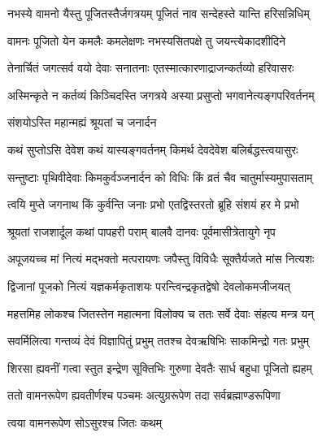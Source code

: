 \twolineshloka
{नभस्ये वामनो यैस्तु पूजितस्तैर्जगत्रयम्}
{पूजितं नाव सन्देहस्ते यान्ति हरिसन्निधिम्} %

\twolineshloka
{वामनः पूजितो येन कमलैः कमलेक्षणः}
{नभस्यसितपक्षे तु जयन्त्येकादशीदिने} %

\twolineshloka
{तेनार्चितं जगत्सर्व वयो देवाः सनातनाः}
{एतस्मात्कारणाद्राजन्कर्तव्यो हरिवासरः} %

\twolineshloka
{अस्मिन्कृते न कर्तव्यं किञ्चिदस्ति जगत्रये}
{अस्या प्रसुप्तो भगवानेत्यङ्गपरिवर्तनम्} %



\onelineshloka
{संशयोऽस्ति महान्मह्यं श्रूयतां च जनार्दन} %

\twolineshloka
{कथं सुप्तोऽसि देवेश कथं यास्यङ्गवर्तनम्}
{किमर्थ देवदेवेश बलिर्बद्धस्त्वयासुरः} %

\twolineshloka
{सन्तुष्टाः पृथिवीदेवाः किमकुर्वञ्जनार्दन}
{को विधिः किं व्रतं चैव चातुर्मास्यमुपासताम्} %

\twolineshloka
{त्वयि मुप्ते जगनाथ किं कुर्वन्ति जनाः प्रभो}
{एतद्विस्तरतो ब्रूहि संशयं हर मे प्रभो} %


\twolineshloka
{श्रूयतां राजशार्दूल कथां पापहरी पराम्}
{बालवै दानवः पूर्वमासीत्रेतायुगे नृप} %

\twolineshloka
{अपूजयच्च मां नित्यं मद्भक्तो मत्परायणः}
{जपैस्तु विविधैः सूक्तैर्यजते मांस नित्यशः} %

\twolineshloka
{द्विजानां पूजको नित्यं यज्ञकर्मकृताशयः}
{परन्त्विन्द्रकृतद्वेषो देवलोकमजीजयत्} %

\twolineshloka
{महत्तमिह लोकश्च जितस्तेन महात्मना}
{विलोक्य च ततः सर्वे देवाः संहत्य मन्त्र यन्} %

\twolineshloka
{सवर्मिलित्वा गन्तव्यं देवं विज्ञापितुं प्रभुम्}
{ततश्च देवऋषिभिः साकमिन्द्रो गतः प्रभुम्} %

\twolineshloka
{शिरसा ह्यवनीं गत्वा स्तुत इन्द्रेण सूक्तिभिः}
{गुरुणा देवतैः सार्ध बहुधा पूजितो ह्यहम्} %

\twolineshloka
{ततो वामनरूपेण ह्यवतीर्णश्च पञ्चमः}
{अत्युग्ररूपेण तदा सर्वब्रह्माण्डरूपिणा} %



\onelineshloka
{त्वया वामनरूपेण सोऽसुरश्च जितः कथम्} %

